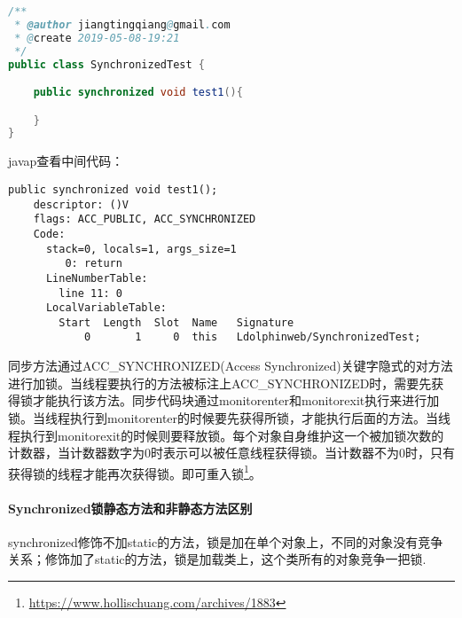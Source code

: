 \documentclass[../../../interview-questions.tex]{subfiles}
\begin{document}
\begin{lstlisting}[language=Java]
/**
 * @author jiangtingqiang@gmail.com
 * @create 2019-05-08-19:21
 */
public class SynchronizedTest {

    public synchronized void test1(){

    }
}
\end{lstlisting}

javap查看中间代码：

\begin{lstlisting}
public synchronized void test1();
    descriptor: ()V
    flags: ACC_PUBLIC, ACC_SYNCHRONIZED
    Code:
      stack=0, locals=1, args_size=1
         0: return
      LineNumberTable:
        line 11: 0
      LocalVariableTable:
        Start  Length  Slot  Name   Signature
            0       1     0  this   Ldolphinweb/SynchronizedTest;
\end{lstlisting}

同步方法通过ACC\_SYNCHRONIZED(Access Synchronized)关键字隐式的对方法进行加锁。当线程要执行的方法被标注上ACC\_SYNCHRONIZED时，需要先获得锁才能执行该方法。同步代码块通过monitorenter和monitorexit执行来进行加锁。当线程执行到monitorenter的时候要先获得所锁，才能执行后面的方法。当线程执行到monitorexit的时候则要释放锁。每个对象自身维护这一个被加锁次数的计数器，当计数器数字为0时表示可以被任意线程获得锁。当计数器不为0时，只有获得锁的线程才能再次获得锁。即可重入锁\footnote{\url{https://www.hollischuang.com/archives/1883}}。

\paragraph{Synchronized锁静态方法和非静态方法区别}

synchronized修饰不加static的方法，锁是加在单个对象上，不同的对象没有竞争关系；修饰加了static的方法，锁是加载类上，这个类所有的对象竞争一把锁.
\end{document}
